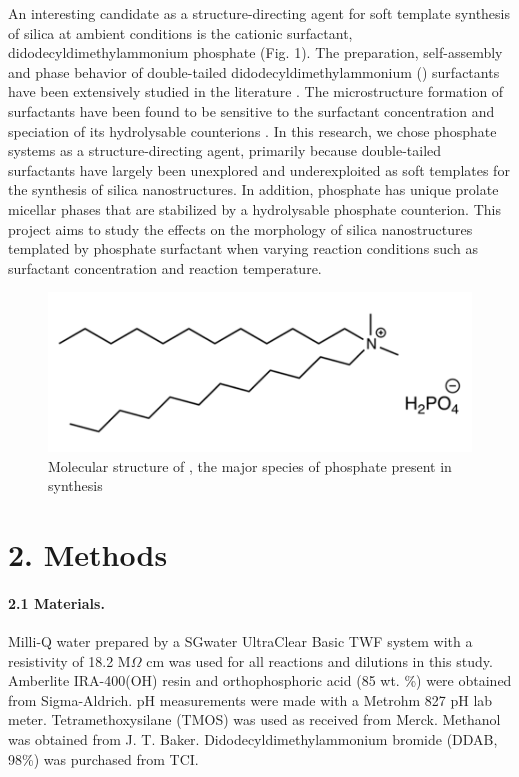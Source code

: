 \documentclass[a4paper,12pt,twocolumn]{article}
\begin{document}
An interesting candidate as a structure-directing agent for soft template synthesis of silica at ambient conditions is the cationic surfactant, didodecyldimethylammonium phosphate (Fig. 1). The preparation, self-assembly and phase behavior of double-tailed didodecyldimethylammonium () surfactants have been extensively studied in the literature \cite{warr1988}. The microstructure formation of  surfactants have been found to be sensitive to the surfactant concentration and speciation of its hydrolysable counterions \cite{liu2014}. In this research, we chose  phosphate systems as a structure-directing agent, primarily because double-tailed surfactants have largely been unexplored and underexploited as soft templates for the synthesis of silica nanostructures. In addition,  phosphate has unique prolate micellar phases that are stabilized by a hydrolysable phosphate counterion. This project aims to study the effects on the morphology of silica nanostructures templated by  phosphate surfactant when varying reaction conditions such as surfactant concentration and reaction temperature.

	\begin{figure}[h]
		\includegraphics[width=\linewidth]{structure.png}
  		\caption{Molecular structure of , the major species of  phosphate present in synthesis}
  		\label{fig:structure}
  	\end{figure}
	 
	 \section{2. Methods}
	 
	 \paragraph{2.1 Materials.} Milli-Q water prepared by a SGwater UltraClear Basic TWF system with a resistivity of 18.2 M$\Omega$ cm was used for all reactions and dilutions in this study. Amberlite IRA-400(OH) resin and orthophosphoric acid (85 wt. \%) were obtained from Sigma-Aldrich. pH measurements were made with a Metrohm 827 pH lab meter. Tetramethoxysilane (TMOS) was used as received from Merck. Methanol was obtained from J. T. Baker. Didodecyldimethylammonium bromide (DDAB, 98\%) was purchased from TCI. 
	 
\end{document}
